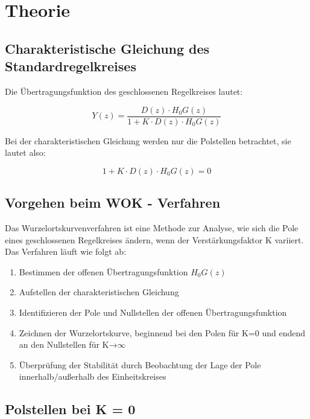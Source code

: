 \chapter{Theorie}


\section{Charakteristische Gleichung des Standardregelkreises}


Die Übertragungsfunktion des geschlossenen Regelkreises lautet:

\begin{equation*}
	Y(z) = \frac{D(z)\cdot H_0G(z)}{1+K\cdot D(z)\cdot H_0G(z)}
\end{equation*}

Bei der charakteristischen Gleichung werden nur die Polstellen betrachtet, sie lautet also: 

\begin{equation*}
	1+K\cdot D(z)\cdot H_0G(z) = 0
\end{equation*}

\section{Vorgehen beim WOK - Verfahren}

Das Wurzelortskurvenverfahren ist eine Methode zur Analyse, wie sich die Pole eines geschlossenen Regelkreises ändern, wenn der Verstärkungsfaktor K variiert. Das Verfahren läuft wie folgt ab:

\begin{enumerate}
	\item Bestimmen der offenen Übertragungsfunktion $H_0G(z)$
	\item Aufstellen der charakteristischen Gleichung
	\item Identifizieren der Pole und Nullstellen der offenen Übertragungsfunktion
	\item Zeichnen der Wurzelortskurve, beginnend bei den Polen für K=0 und endend an den Nullstellen für K→$\infty$
	\item Überprüfung der Stabilität durch Beobachtung der Lage der Pole innerhalb/außerhalb des Einheitskreises
\end{enumerate}
\newpage

\section{Polstellen bei K = 0}

